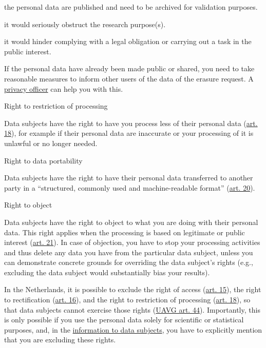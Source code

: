 \documentclass[
]{book}
\begin{document}
the personal data are published and need to be archived for validation
purposes.

it would seriously obstruct the research purpose(s).

it would hinder complying with a legal obligation or carrying out a task
in the public interest.

If the personal data have already been made public or shared, you need to
take reasonable measures to inform other users of the data of the erasure
request. A \protect\hyperlink{support}{privacy officer} can help you with this.

Right to restriction of processing

Data subjects have the right to have you process less of their personal data
(\href{https://gdpr-info.eu/art-18-gdpr/}{art. 18}),
for example if their personal data are inaccurate or your processing of it
is unlawful or no longer needed.

Right to data portability

Data subjects have the right to have their personal data transferred to
another party in a ``structured, commonly used and machine-readable format''
(\href{https://gdpr-info.eu/art-20-gdpr/}{art. 20}).

Right to object

Data subjects have the right to object to what you are doing with their
personal data. This right applies when the processing is based on legitimate
or public interest (\href{https://gdpr-info.eu/art-21-gdpr/}{art. 21}).
In case of objection, you have to stop your processing activities and thus
delete any data you have from the particular data subject, unless you can
demonstrate concrete grounds for overriding the data subject's rights
(e.g., excluding the data subject would substantially bias your results).

In the Netherlands, it is possible to exclude the right of access
(\href{https://gdpr-info.eu/art-15-gdpr/}{art. 15}), the right to
rectification (\href{https://gdpr-info.eu/art-16-gdpr/}{art. 16}),
and the right to restriction of processing
(\href{https://gdpr-info.eu/art-18-gdpr/}{art. 18}), so that data
subjects cannot exercise those rights
(\href{https://wetten.overheid.nl/jci1.3:c:BWBR0040940\&hoofdstuk=4\&artikel=44\&z=2021-07-01\&g=2021-07-01}{UAVG art. 44}).
Importantly, this is only possible if you use the personal data solely for
scientific or statistical purposes, and, in the
\protect\hyperlink{privacy-notices}{information to data subjects}, you have to explicitly
mention that you are excluding these rights.
\end{document}
